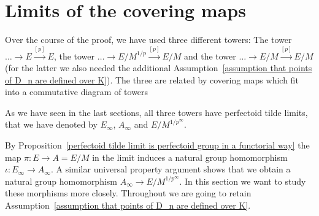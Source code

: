 \documentclass[11pt,oneside]{amsart}
\theoremstyle{definition}
\theoremstyle{remark}
\begin{document}
	
	\section{Limits of the covering maps}
	
	Over the course of the proof, we have used three different towers: The tower $\dots \rightarrow E\xrightarrow{[p]} E$, the tower $\dots \rightarrow E/M^{1/p} \xrightarrow{[p]} E/M$ and the tower $\dots \rightarrow E/M \xrightarrow{[p]} E/M$ (for the latter we also needed the additional Assumption~\ref{assumption that points of D_n are defined over K}). The three are related by covering maps which fit into a commutative diagram of towers
	\begin{center}
	\end{center}
	As we have seen in the last sections, all three towers have perfectoid tilde limits, that we have denoted by $E_\infty$, $A_\infty$ and $E/M^{1/p^\infty}$.
	
	By Proposition~\ref{perfectoid tilde limit is perfectoid group in a functorial way} the map $\pi:E\rightarrow A=E/M$ in the limit induces a natural group homomorphism $\iota:E_\infty \rightarrow A_\infty$. A similar universal property argument shows that we obtain a natural group homomorphism $A_\infty \rightarrow E/M^{1/p^\infty}$. In this section we want to study these morphisms more closely. Throughout we are going to retain Assumption~\ref{assumption that points of D_n are defined over K}.
	
\end{document}
